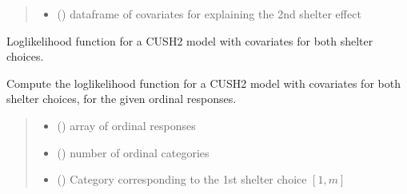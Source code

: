 \documentclass[letterpaper,10pt,english]{sphinxmanual}
\begin{document}
\begin{fulllineitems}
\begin{quote}
\begin{description}
\begin{itemize}
\item {} 
\sphinxAtStartPar
{} () \textendash{} dataframe of covariates for explaining the 2nd shelter effect

\end{itemize}

\end{description}\end{quote}

\end{fulllineitems}


\begin{fulllineitems}
\label{\detokenize{cubmods:cubmods.cush2_xx.loglik}}
\pysigstartsignatures
{}
\pysigstopsignatures
\sphinxAtStartPar
Log\sphinxhyphen{}likelihood function for a CUSH2 model with covariates
for both shelter choices.

\sphinxAtStartPar
Compute the log\sphinxhyphen{}likelihood function for a CUSH2 model 
with covariates for both shelter choices,
for the given ordinal responses.
\begin{quote}\begin{description}
\begin{itemize}
\item {} 
\sphinxAtStartPar
{} () \textendash{} array of ordinal responses

\item {} 
\sphinxAtStartPar
{} () \textendash{} number of ordinal categories

\item {} 
\sphinxAtStartPar
{} () \textendash{} Category corresponding to the 1st shelter choice \([1,m]\)


\end{itemize}
\end{description}
\end{quote}
\end{fulllineitems}
\end{document}
